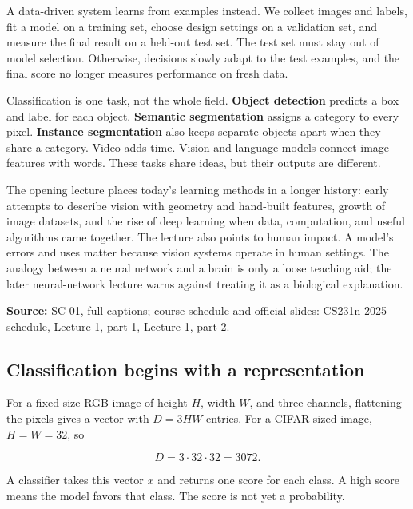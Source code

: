A data-driven system learns from examples instead. We collect images and labels, fit a model on a training set, choose design settings on a validation set, and measure the final result on a held-out test set. The test set must stay out of model selection. Otherwise, decisions slowly adapt to the test examples, and the final score no longer measures performance on fresh data.

Classification is one task, not the whole field. \textbf{Object detection} predicts a box and label for each object. \textbf{Semantic segmentation} assigns a category to every pixel. \textbf{Instance segmentation} also keeps separate objects apart when they share a category. Video adds time. Vision and language models connect image features with words. These tasks share ideas, but their outputs are different.

The opening lecture places today's learning methods in a longer history: early attempts to describe vision with geometry and hand-built features, growth of image datasets, and the rise of deep learning when data, computation, and useful algorithms came together. The lecture also points to human impact. A model's errors and uses matter because vision systems operate in human settings. The analogy between a neural network and a brain is only a loose teaching aid; the later neural-network lecture warns against treating it as a biological explanation.

\textbf{Source:} SC-01, full captions; course schedule and official slides: \href{https://cs231n.stanford.edu/2025/schedule.html}{CS231n 2025 schedule}, \href{https://cs231n.stanford.edu/slides/2025/lecture_1_part_1.pdf}{Lecture 1, part 1}, \href{https://cs231n.stanford.edu/slides/2025/lecture_1_part_2.pdf}{Lecture 1, part 2}.

\subsection{Classification begins with a representation}\label{04-visual-computing-ii-ch031-classification-begins-with-a-representation}

For a fixed-size RGB image of height \(H\), width \(W\), and three channels, flattening the pixels gives a vector with \(D=3HW\) entries. For a CIFAR-sized image, \(H=W=32\), so

\[D=3\cdot32\cdot32=3072.\]

A classifier takes this vector \(x\) and returns one score for each class. A high score means the model favors that class. The score is not yet a probability.

